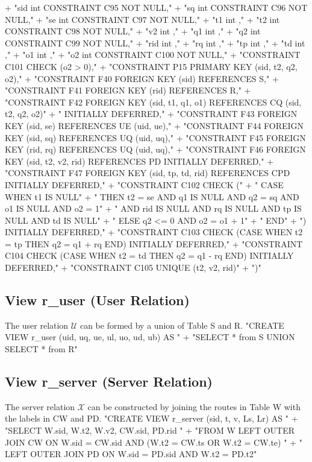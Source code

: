   + "sid int  CONSTRAINT C95 NOT NULL,"
  + "sq  int  CONSTRAINT C96 NOT NULL,"
  + "se  int  CONSTRAINT C97 NOT NULL,"
  + "t1  int  ,"
  + "t2  int  CONSTRAINT C98 NOT NULL,"
  + "v2  int  ,"
  + "q1  int  ,"
  + "q2  int  CONSTRAINT C99 NOT NULL,"
  + "rid int  ,"
  + "rq  int  ,"
  + "tp  int  ,"
  + "td  int  ,"
  + "o1  int  ,"
  + "o2  int  CONSTRAINT C100 NOT NULL,"
  + "CONSTRAINT C101 CHECK (o2 > 0),"
  + "CONSTRAINT P15 PRIMARY KEY (sid, t2, q2, o2),"
  + "CONSTRAINT F40 FOREIGN KEY (sid) REFERENCES S,"
  + "CONSTRAINT F41 FOREIGN KEY (rid) REFERENCES R,"
  + "CONSTRAINT F42 FOREIGN KEY (sid, t1, q1, o1) REFERENCES CQ (sid, t2, q2, o2)"
  + "  INITIALLY DEFERRED,"
  + "CONSTRAINT F43 FOREIGN KEY (sid, se) REFERENCES UE (uid, ue),"
  + "CONSTRAINT F44 FOREIGN KEY (sid, sq) REFERENCES UQ (uid, uq),"
  + "CONSTRAINT F45 FOREIGN KEY (rid, rq) REFERENCES UQ (uid, uq),"
  + "CONSTRAINT F46 FOREIGN KEY (sid, t2, v2, rid) REFERENCES PD INITIALLY DEFERRED,"
  + "CONSTRAINT F47 FOREIGN KEY (sid, tp, td, rid) REFERENCES CPD INITIALLY DEFERRED,"
  + "CONSTRAINT C102 CHECK ("
  + "  CASE WHEN t1 IS NULL"
  + "    THEN t2 = se AND q1 IS NULL AND q2 = sq AND o1 IS NULL AND o2 = 1"
  + "        AND rid IS NULL AND rq IS NULL AND tp IS NULL AND td IS NULL"
  + "    ELSE q2 <= 0 AND o2 = o1 + 1"
  + "  END"
  + ") INITIALLY DEFERRED,"
  + "CONSTRAINT C103 CHECK (CASE WHEN t2 = tp THEN q2 = q1 + rq END) INITIALLY DEFERRED,"
  + "CONSTRAINT C104 CHECK (CASE WHEN t2 = td THEN q2 = q1 - rq END) INITIALLY DEFERRED,"
  + "CONSTRAINT C105 UNIQUE (t2, v2, rid)"
  + ")"
\nwendcode{}\nwdocspar

\subsection{View r\_user (User Relation)}
The user relation $\mathcal{U}$ can be formed by a union of Table S and R.
\nwenddocs{}\endmoddef{}
"CREATE VIEW r_user (uid, uq, ue, ul, uo, ud, ub) AS "
  + "SELECT * from S UNION SELECT * from R"
\nwendcode{}\nwdocspar

\subsection{View r\_server (Server Relation)}
The server relation $\mathcal{X}$ can be constructed by joining the routes in
Table W with the labels in CW and PD.
\nwenddocs{}\endmoddef{}
"CREATE VIEW r_server (sid, t, v, Ls, Lr) AS "
  + "SELECT W.sid, W.t2, W.v2, CW.sid, PD.rid "
  + "FROM W LEFT OUTER JOIN CW ON W.sid = CW.sid AND (W.t2 = CW.ts OR W.t2 = CW.te) "
  + "  LEFT OUTER JOIN PD ON W.sid = PD.sid AND W.t2 = PD.t2"
\nwendcode{}\nwdocspar

